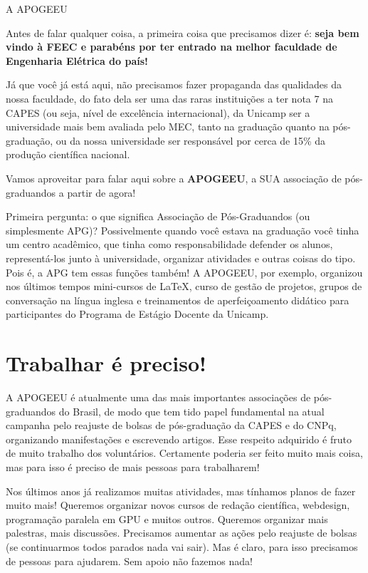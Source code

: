 
\begin{story}{A APOGEEU}

Antes de falar qualquer coisa, a primeira coisa que precisamos dizer é: \textbf{seja bem vindo à FEEC e parabéns por ter entrado na melhor faculdade de Engenharia Elétrica do país!}

Já que você já está aqui, não precisamos fazer propaganda das qualidades da nossa faculdade, do fato dela ser uma das raras instituições a ter nota 7 na CAPES (ou seja, nível de excelência internacional), da Unicamp ser a universidade mais bem avaliada pelo MEC, tanto na graduação quanto na pós-graduação, ou da nossa universidade ser responsável por cerca de 15\% da produção científica nacional.

Vamos aproveitar para falar aqui sobre a \textbf{APOGEEU}, a SUA associação de pós-graduandos a partir de agora!

Primeira pergunta: o que significa Associação de Pós-Graduandos (ou simplesmente APG)? Possivelmente quando você estava na graduação você tinha um centro acadêmico, que tinha como responsabilidade defender os alunos, representá-los junto à universidade, organizar atividades e outras coisas do tipo. Pois é, a APG tem essas funções também! A APOGEEU, por exemplo, organizou nos últimos tempos mini-cursos de \LaTeX, curso de gestão de projetos, grupos de conversação na língua inglesa e treinamentos de aperfeiçoamento didático para participantes do Programa de Estágio Docente da Unicamp.

\section*{Trabalhar é preciso!}

A APOGEEU é atualmente uma das mais importantes associações de pós-graduandos do Brasil, de modo que tem tido papel fundamental na atual campanha pelo reajuste de bolsas de pós-graduação da CAPES e do CNPq, organizando manifestações e escrevendo artigos. Esse respeito adquirido é fruto de muito trabalho dos voluntários. Certamente poderia ser feito muito mais coisa, mas para isso é preciso de mais pessoas para trabalharem!

Nos últimos anos já realizamos muitas atividades, mas tínhamos planos de fazer muito mais! Queremos organizar novos cursos de redação científica, webdesign, programação paralela em GPU e muitos outros. Queremos organizar mais palestras, mais discussões. Precisamos aumentar as ações pelo reajuste de bolsas (se continuarmos todos parados nada vai sair). Mas é claro, para isso precisamos de pessoas para ajudarem. Sem apoio não fazemos nada!


\end{story}
